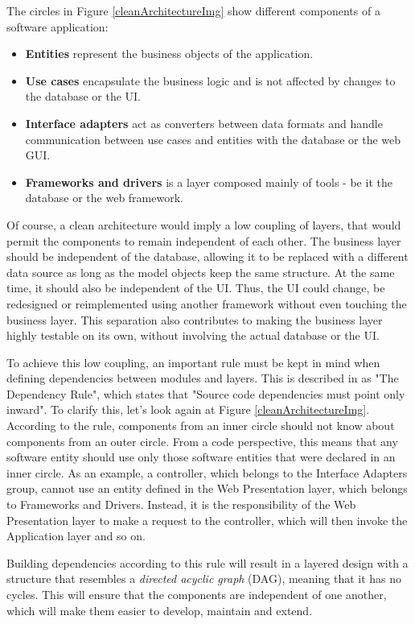 The circles in Figure \ref{cleanArchitectureImg} show different components of a software application:

\begin{itemize}
  \item \textbf{Entities} represent the business objects of the application.
  \item \textbf{Use cases} encapsulate the business logic and is not affected by changes to the database or the UI.
  \item \textbf{Interface adapters} act as converters between data formats and handle communication between use cases and entities with the database or the web GUI.
  \item \textbf{Frameworks and drivers} is a layer composed mainly of tools - be it the database or the web framework.
\end{itemize}

Of course, a clean architecture would imply a low coupling of layers, that would permit the components to remain independent of each other. The business layer should be independent of the database, allowing it to be replaced with a different data source as long as the model objects keep the same structure. At the same time, it should also be independent of the UI. Thus, the UI could change, be redesigned or reimplemented using another framework without even touching the business layer. This separation also contributes to making the business layer highly testable on its own, without involving the actual database or the UI.

To achieve this low coupling, an important rule must be kept in mind when defining dependencies between modules and layers. This is described in \cite{cleanArchitecture} as "The Dependency Rule", which states that "Source code dependencies must point only inward". To clarify this, let's look again at Figure \ref{cleanArchitectureImg}. According to the rule, components from an inner circle should not know about components from an outer circle. From a code perspective, this means that any software entity should use only those software entities that were declared in an inner circle. As an example, a controller, which belongs to the Interface Adapters group, cannot use an entity defined in the Web Presentation layer, which belongs to Frameworks and Drivers. Instead, it is the responsibility of the Web Presentation layer to make a request to the controller, which will then invoke the Application layer and so on.

Building dependencies according to this rule will result in a layered design with a structure that resembles a \textit{directed acyclic graph} (DAG), meaning that it has no cycles. This will ensure that the components are independent of one another, which will make them easier to develop, maintain and extend.


